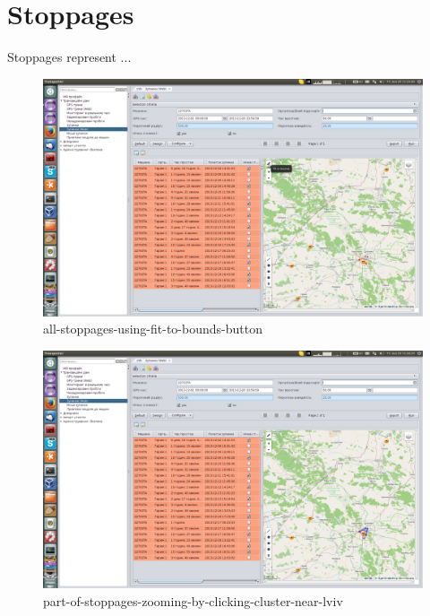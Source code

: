 \section{Stoppages}

Stoppages represent ...

\begin{figure}[!htp]
\centering
\includegraphics[width=16cm]{chapters/03-stoppages/images/21-all-stoppages-using-fit-to-bounds-button.png}
\caption{all-stoppages-using-fit-to-bounds-button}\label{fig:21}
\end{figure}

\begin{figure}[!htp]
\centering
\includegraphics[width=16cm]{chapters/03-stoppages/images/22-part-of-stoppages-zooming-by-clicking-cluster-near-lviv.png}
\caption{part-of-stoppages-zooming-by-clicking-cluster-near-lviv}\label{fig:22}
\end{figure}


